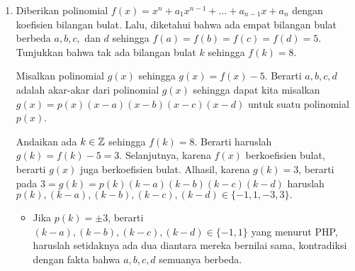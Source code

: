 \documentclass[11pt]{scrartcl}
\renewcommand{\dangle}{\measuredangle}
\begin{document}
\begin{enumerate}[resume]
\begin{solusi}
		Dari fakta-fakta tersebut, didapat $\dangle A_BA_1A = \dangle AA_1A_C = 90^\circ$, maka $A_B, A_1, A_C$ segaris dan juga didapat bahwa $AA_1$ adalah garis tinggi $\triangle AA_BA_C$.
		
		Sekarang, misalkan $H_A$ adalah perpotongan antara $CA_C$ dan $BA_B$, maka $\angle ACH_A = \angle H_ABA = 90^\circ$ yang mengakibatkan $H_A$ adalah titik tinggi $\triangle AA_CA_B$ sekaligus $AH_A$ menjadi diameter lingkaran luar $\triangle ABC$. Karena $AA_1$ adalah garis tinggi $\triangle AA_BA_C$, maka $H_A$ berada di garis $AA_1$.
		
		Definisikan $H_B$ dan $H_C$ secara serupa dengan definisi $H_A$,maka didapat pula bahwa $H_B$ dan $H_C$ berturut-turut berada di garis $BB_1$ dan $CC_1$. Oleh karena itu, $AH_A$, $BH_B$, dan $CH_C$ adalah diameter lingkaran luar $\triangle ABC$, maka didapat $AH_A$, $BH_B$, dan $CH_C$ berpotongan di satu titik yaitu pusat lingkaran. Karena $A_1,B_1,C_1$ berturut-turut ada di garis $AH_A$, $BH_B$, $CH_C$ maka hal ini berakibat $AA_1$, $BB_1$, dan $CC_1$ berpotongan di satu titik. \qed
    \end{solusi}

    \item Diberikan polinomial $f(x)=x^n+a_1x^{n-1}+\dots+a_{n-1}x+a_n$ dengan koefisien bilangan bulat. Lalu, diketahui bahwa ada empat bilangan bulat berbeda $a,b,c,$ dan $d$ sehingga $f(a)=f(b)=f(c)=f(d)=5$. Tunjukkan bahwa tak ada bilangan bulat $k$ sehingga $f(k)=8$.
    \begin{solusi}
        Misalkan polinomial $g(x)$ sehingga $g(x)=f(x)-5$. Berarti $a,b,c,d$ adalah akar-akar dari polinomial $g(x)$ sehingga dapat kita misalkan $g(x)=p(x)(x-a)(x-b)(x-c)(x-d)$ untuk suatu polinomial $p(x)$.
        
        Andaikan ada $k \in \mathbb Z$ sehingga $f(k)=8$. Berarti haruslah $g(k)=f(k)-5=3$. Selanjutnya, karena $f(x)$ berkoefisien bulat, berarti $g(x)$ juga berkoefisien bulat. Alhasil, karena $g(k)=3$, berarti pada $3=g(k)=p(k)(k-a)(k-b)(k-c)(k-d)$ haruslah \\$p(k), (k-a), (k-b), (k-c), (k-d) \in \{-1,1,-3,3\}.$
        
        \begin{itemize}
        \item Jika $p(k)=\pm 3$, berarti $(k-a), (k-b), (k-c), (k-d) \in \{-1,1\}$ yang menurut PHP, haruslah setidaknya ada dua diantara mereka bernilai sama, kontradiksi dengan fakta bahwa $a,b,c,d$ semuanya berbeda.
                        

\end{itemize}
\end{solusi}
\end{enumerate}
\end{document}
